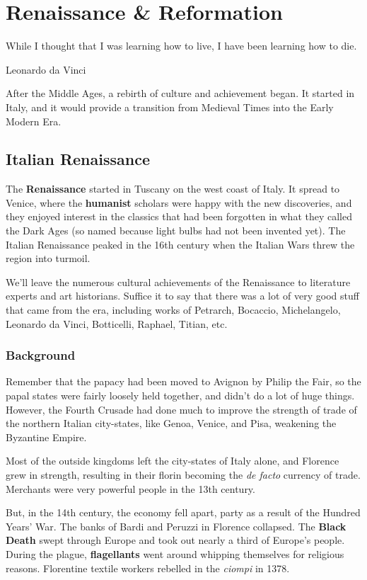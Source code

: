 \chapter{Renaissance \& Reformation}

\epigraph{%
  While I thought that I was learning how to live, I have been learning how to die.
}{Leonardo da Vinci}

After the Middle Ages, a rebirth of culture and achievement began.
It started in Italy, and it would provide a transition from Medieval Times into the Early Modern Era.

\section{Italian Renaissance}

The \textbf{Renaissance} started in Tuscany on the west coast of Italy.
It spread to Venice, where the \textbf{humanist} scholars were happy with the new discoveries,
and they enjoyed interest in the classics that had been forgotten in what they called the Dark Ages
(so named because light bulbs had not been invented yet).
The Italian Renaissance peaked in the 16th century
when the Italian Wars threw the region into turmoil.

We'll leave the numerous cultural achievements of the Renaissance
to literature experts and art historians.
Suffice it to say that there was a lot of very good stuff that came from the era,
including works of
Petrarch, Bocaccio, Michelangelo, Leonardo da Vinci, Botticelli, Raphael, Titian, etc.

\subsection*{Background}

Remember that the papacy had been moved to Avignon by Philip the Fair,
so the papal states were fairly loosely held together, and didn't do a lot of huge things.
However,
the Fourth Crusade had done much to improve the strength of trade
of the northern Italian city-states, like Genoa, Venice, and Pisa, weakening the Byzantine Empire.

Most of the outside kingdoms left the city-states of Italy alone,
and Florence grew in strength,
resulting in their florin becoming the \textit{de facto} currency of trade.
Merchants were very powerful people in the 13th century.

But, in the 14th century, the economy fell apart, party as a result of the Hundred Years' War.
The banks of Bardi and Peruzzi in Florence collapsed.
The \textbf{Black Death} swept through Europe and took out nearly a third of Europe's people.
During the plague, \textbf{flagellants} went around whipping themselves for religious reasons.
Florentine textile workers rebelled in the \textit{ciompi} in 1378.

